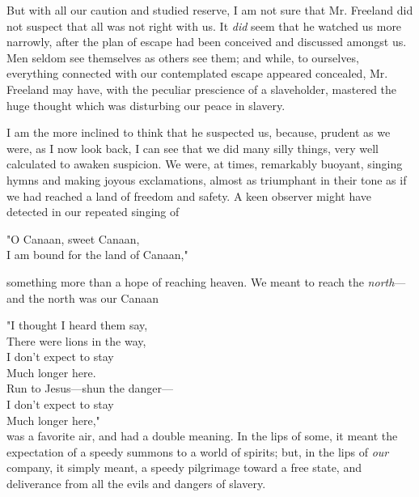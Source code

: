 But with all our caution and studied reserve, I am not sure that Mr.
Freeland did not suspect that all was not right with us. It \emph{did}
seem that he watched us more narrowly, after the plan of escape had been
conceived and discussed amongst us. Men seldom see themselves as others
see them; and while, to ourselves, everything connected with our
contemplated escape appeared concealed, Mr. Freeland may have, with the
peculiar prescience of a slaveholder, mastered the huge thought which
was disturbing our peace in slavery.

I am the more inclined to think that he suspected us, because, prudent
as we were, as I now look back, I can see that we did many silly things,
very well calculated to awaken suspicion. We were, at times, remarkably
buoyant, singing hymns and making joyous exclamations, almost as
triumphant in their tone as if we had reached a land of freedom and
safety. A keen observer might have detected in our repeated singing of

"O Canaan, sweet Canaan,\\
I am bound for the land of Canaan,"

something more than a hope of reaching heaven. We meant to reach the
\emph{north}---and the north was our Canaan

"I thought I heard them say,\\
There were lions in the way,\\
I don't expect to stay\\
{﻿}Much longer here.\\
{\protect\hypertarget{279}{}{}}Run to Jesus---shun the danger---\\
I don't expect to stay\\
{﻿}Much longer here,"\\

was a favorite air, and had a double meaning. In the lips of some, it
meant the expectation of a speedy summons to a world of spirits; but, in
the lips of \emph{our} company, it simply meant, a speedy pilgrimage
toward a free state, and deliverance from all the evils and dangers of
slavery.

